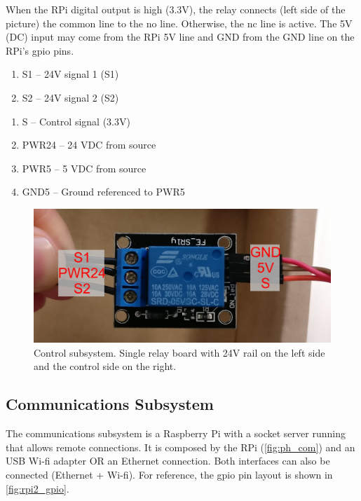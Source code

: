 \documentclass[twoside,a4paper]{refart}
\begin{document}
When the RPi digital output is high (3.3V), the relay connects (left side of the picture) the common line to the \gls{no} line. Otherwise, the \gls{nc} line is active.
The 5V (DC) input may come from the RPi 5V line and GND from the GND line on the RPi's \gls{gpio} pins.

\begin{enumerate}
	\item
	S1 -- 24V signal 1 (S1)
	\item
	S2 -- 24V signal 2 (S2)
\end{enumerate}

\begin{enumerate}
	\item
	 S -- Control signal (3.3V)
	\item PWR24 -- 24 VDC from source
	\item PWR5 -- 5 VDC from source
	\item GND5 -- Ground referenced to PWR5
\end{enumerate}

\begin{figure}[H]
	\centering
	\includegraphics[width=1.0\linewidth]{ph_control}
	\caption{Control subsystem. Single relay board with 24V rail on the left side and the control side on the right.}
	\label{fig:ph_control}
\end{figure}

\subsection{Communications Subsystem}
The communications subsystem is a Raspberry Pi with a socket server running that allows remote connections. It is composed by the RPi (\cref{fig:ph_com}) and an USB Wi-fi adapter OR an Ethernet connection. Both interfaces can also be connected (Ethernet + Wi-fi). For reference, the \gls{gpio} pin layout is shown in \cref{fig:rpi2_gpio}.
\end{document}
